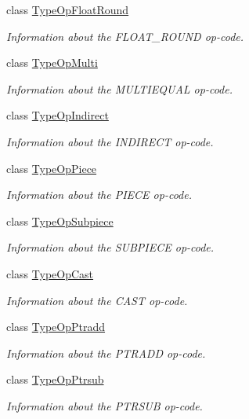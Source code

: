 \begin{DoxyCompactItemize}
class \mbox{\hyperlink{class_type_op_float_round}{Type\+Op\+Float\+Round}}
\begin{DoxyCompactList}\small\item\em Information about the F\+L\+O\+A\+T\+\_\+\+R\+O\+U\+ND op-\/code. \end{DoxyCompactList}\item 
class \mbox{\hyperlink{class_type_op_multi}{Type\+Op\+Multi}}
\begin{DoxyCompactList}\small\item\em Information about the M\+U\+L\+T\+I\+E\+Q\+U\+AL op-\/code. \end{DoxyCompactList}\item 
class \mbox{\hyperlink{class_type_op_indirect}{Type\+Op\+Indirect}}
\begin{DoxyCompactList}\small\item\em Information about the I\+N\+D\+I\+R\+E\+CT op-\/code. \end{DoxyCompactList}\item 
class \mbox{\hyperlink{class_type_op_piece}{Type\+Op\+Piece}}
\begin{DoxyCompactList}\small\item\em Information about the P\+I\+E\+CE op-\/code. \end{DoxyCompactList}\item 
class \mbox{\hyperlink{class_type_op_subpiece}{Type\+Op\+Subpiece}}
\begin{DoxyCompactList}\small\item\em Information about the S\+U\+B\+P\+I\+E\+CE op-\/code. \end{DoxyCompactList}\item 
class \mbox{\hyperlink{class_type_op_cast}{Type\+Op\+Cast}}
\begin{DoxyCompactList}\small\item\em Information about the C\+A\+ST op-\/code. \end{DoxyCompactList}\item 
class \mbox{\hyperlink{class_type_op_ptradd}{Type\+Op\+Ptradd}}
\begin{DoxyCompactList}\small\item\em Information about the P\+T\+R\+A\+DD op-\/code. \end{DoxyCompactList}\item 
class \mbox{\hyperlink{class_type_op_ptrsub}{Type\+Op\+Ptrsub}}
\begin{DoxyCompactList}\small\item\em Information about the P\+T\+R\+S\+UB op-\/code. \end{DoxyCompactList}\item 

\end{DoxyCompactItemize}

